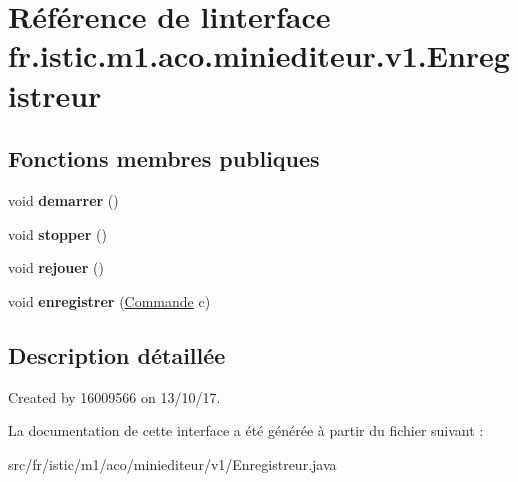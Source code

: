 \hypertarget{interfacefr_1_1istic_1_1m1_1_1aco_1_1miniediteur_1_1v1_1_1Enregistreur}{}\section{Référence de l\textquotesingle{}interface fr.\+istic.\+m1.\+aco.\+miniediteur.\+v1.\+Enregistreur}
\label{interfacefr_1_1istic_1_1m1_1_1aco_1_1miniediteur_1_1v1_1_1Enregistreur}
\subsection*{Fonctions membres publiques}
\begin{DoxyCompactItemize}
\item 
\mbox{\label{interfacefr_1_1istic_1_1m1_1_1aco_1_1miniediteur_1_1v1_1_1Enregistreur_a9570ac8bcb44dd208e6f0e3e4db47d15}} 
void {\bfseries demarrer} ()
\item 
\mbox{\label{interfacefr_1_1istic_1_1m1_1_1aco_1_1miniediteur_1_1v1_1_1Enregistreur_a1603b6f922f9ce7520fe292d0ede82f1}} 
void {\bfseries stopper} ()
\item 
\mbox{\label{interfacefr_1_1istic_1_1m1_1_1aco_1_1miniediteur_1_1v1_1_1Enregistreur_af13847c7dcf76aed6cbac89c94f3ee46}} 
void {\bfseries rejouer} ()
\item 
\mbox{\label{interfacefr_1_1istic_1_1m1_1_1aco_1_1miniediteur_1_1v1_1_1Enregistreur_a3837fe648c4b3fd41f8746a35dfb9695}} 
void {\bfseries enregistrer} (\hyperlink{interfacefr_1_1istic_1_1m1_1_1aco_1_1miniediteur_1_1v1_1_1Commande}{Commande} c)
\end{DoxyCompactItemize}


\subsection{Description détaillée}
Created by 16009566 on 13/10/17. 

La documentation de cette interface a été générée à partir du fichier suivant \+:\begin{DoxyCompactItemize}
\item 
src/fr/istic/m1/aco/miniediteur/v1/Enregistreur.\+java\end{DoxyCompactItemize}

